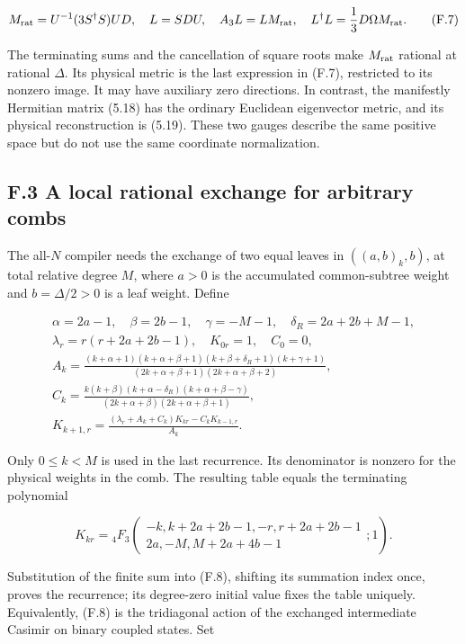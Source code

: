 \[
M_{\rm rat}=U^{-1}(3S^\dagger S)UD,
\quad L=SDU,
\quad A_3L=LM_{\rm rat},
\quad L^\dagger L=\frac13D\Omega M_{\rm rat}.
\tag{F.7}
\]

The terminating sums and the cancellation of square roots make \(M_{\rm rat}\) rational at rational \(\Delta\). Its physical metric is the last expression in (F.7), restricted to its nonzero image. It may have auxiliary zero directions. In contrast, the manifestly Hermitian matrix (5.18) has the ordinary Euclidean eigenvector metric, and its physical reconstruction is (5.19). These two gauges describe the same positive space but do not use the same coordinate normalization.

\hypertarget{f.3-a-local-rational-exchange-for-arbitrary-combs}{%
\subsection{F.3 A local rational exchange for arbitrary combs}\label{f.3-a-local-rational-exchange-for-arbitrary-combs}}

The all-\(N\) compiler needs the exchange of two equal leaves in \(((a,b)_k,b)\), at total relative degree \(M\), where \(a>0\) is the accumulated common-subtree weight and \(b=\Delta/2>0\) is a leaf weight. Define

\[
\begin{gathered}
\alpha=2a-1,\quad\beta=2b-1,\quad
\gamma=-M-1,\quad\delta_R=2a+2b+M-1,\\
\lambda_r=r(r+2a+2b-1),\quad K_{0r}=1,\quad C_0=0,\\
A_k=\frac{(k+\alpha+1)(k+\alpha+\beta+1)(k+\beta+\delta_R+1)(k+\gamma+1)}
{(2k+\alpha+\beta+1)(2k+\alpha+\beta+2)},\\
C_k=\frac{k(k+\beta)(k+\alpha-\delta_R)(k+\alpha+\beta-\gamma)}
{(2k+\alpha+\beta)(2k+\alpha+\beta+1)},\\
K_{k+1,r}=\frac{(\lambda_r+A_k+C_k)K_{kr}-C_kK_{k-1,r}}{A_k}.
\end{gathered}
\tag{F.8}
\]

Only \(0\le k<M\) is used in the last recurrence. Its denominator is nonzero for the physical weights in the comb. The resulting table equals the terminating polynomial

\[
K_{kr}={}_4F_3\!\left(
\begin{matrix}-k,k+2a+2b-1,-r,r+2a+2b-1\\
2a,-M,M+2a+4b-1\end{matrix};1\right).
\tag{F.9}
\]

Substitution of the finite sum into (F.8), shifting its summation index once, proves the recurrence; its degree-zero initial value fixes the table uniquely. Equivalently, (F.8) is the tridiagonal action of the exchanged intermediate Casimir on binary coupled states. Set

